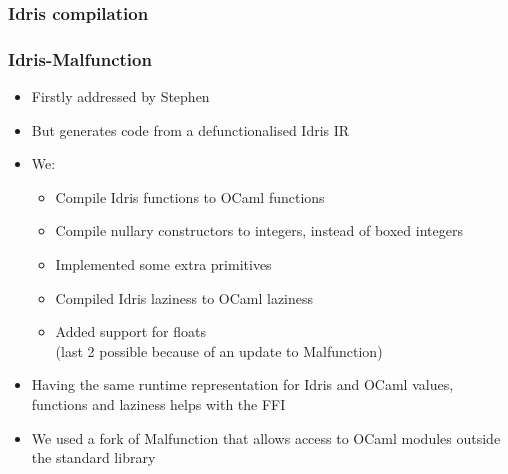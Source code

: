 \documentclass[aspectratio=169]{beamer}
\begin{document}
\begin{frame}
  \frametitle{Idris compilation}
  \centering
\end{frame}

\begin{frame}[t]
  \frametitle{Idris-Malfunction}
  \begin{itemize}
    \item Firstly addressed by Stephen
    \item But generates code from a defunctionalised Idris IR
    \item We:
          \begin{itemize}
            \item<2-> Compile Idris functions to OCaml functions
            \item<3-> Compile nullary constructors to integers, instead of
                  boxed integers
            \item<4-> Implemented some extra primitives
            \item<5-> Compiled Idris laziness to OCaml laziness
            \item<6-> Added support for floats
                  \\ (last 2 possible because of an update to Malfunction)
          \end{itemize}
    \item<7-> Having the same runtime representation for Idris and OCaml
          values, functions and laziness helps with the FFI
    \item<8-> We used a fork of Malfunction that allows access to OCaml
    modules outside the standard library
  \end{itemize}
\end{frame}
\end{document}
